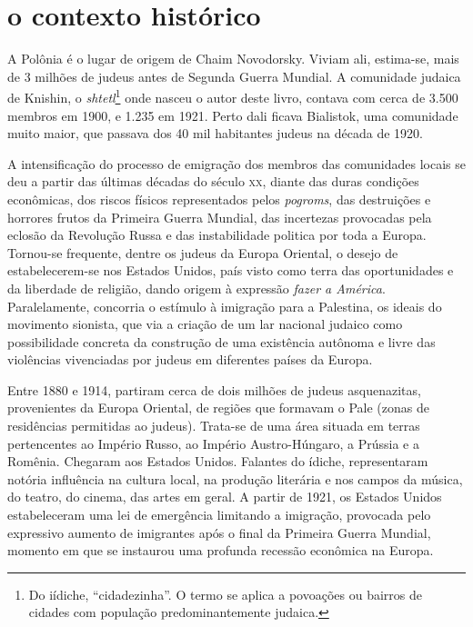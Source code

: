 \section{o contexto histórico}

A Polônia é o lugar de origem de Chaim Novodorsky. Viviam ali, estima-se, mais de
3 milhões de judeus antes de Segunda Guerra Mundial. A comunidade
judaica de Knishin, o \textit{shtetl}\footnote{Do iídiche, ``cidadezinha''. O termo se aplica a povoações ou bairros de cidades com população predominantemente judaica.} onde nasceu o autor deste livro, contava com cerca de 3.500 membros em 1900, e 1.235 em 1921. Perto dali ficava Bialistok, uma comunidade muito maior, que passava dos 40 mil habitantes judeus na
década de 1920. 

A intensificação do processo de emigração dos membros das comunidades
locais se deu a partir das últimas décadas do século \textsc{xx}, diante das
duras condições econômicas, dos riscos físicos representados pelos
\textit{pogroms}, das destruições e horrores frutos da Primeira Guerra Mundial,
das incertezas provocadas pela eclosão da Revolução Russa e das
instabilidade politica por toda a Europa. Tornou-se frequente, dentre os
judeus da Europa Oriental, o desejo de estabelecerem-se nos Estados
Unidos, país visto como terra das oportunidades e da liberdade de
religião, dando origem à expressão \textit{fazer a América}. Paralelamente,
concorria o estímulo à imigração para a Palestina, os ideais do movimento
sionista, que via a criação de um lar nacional judaico como
possibilidade concreta da construção de uma existência autônoma e livre
das violências vivenciadas por judeus em diferentes países da Europa.

Entre 1880 e 1914, partiram cerca de dois milhões de judeus
asquenazitas, provenientes da Europa Oriental, de regiões que formavam o
Pale (zonas de residências permitidas ao judeus). Trata-se de uma área
situada em terras pertencentes ao Império Russo, ao Império
Austro-Húngaro, a Prússia e a Romênia. Chegaram aos Estados Unidos.
Falantes do ídiche, representaram notória influência na cultura local,
na produção literária e nos campos da música, do teatro, do cinema, das
artes em geral. A partir de 1921, os Estados Unidos estabeleceram uma
lei de emergência limitando a imigração, provocada pelo expressivo
aumento de imigrantes após o final da Primeira Guerra Mundial, momento
em que se instaurou uma profunda recessão econômica na Europa.

